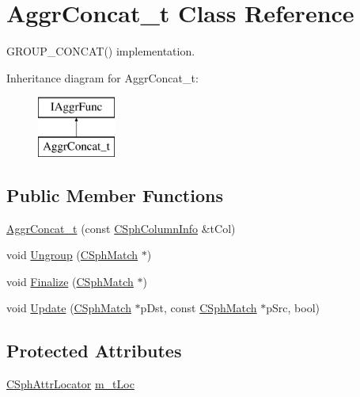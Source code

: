 \hypertarget{classAggrConcat__t}{\section{Aggr\-Concat\-\_\-t Class Reference}
\label{classAggrConcat__t}
}


G\-R\-O\-U\-P\-\_\-\-C\-O\-N\-C\-A\-T() implementation.  


Inheritance diagram for Aggr\-Concat\-\_\-t\-:\begin{figure}[H]
\begin{center}
\leavevmode
\includegraphics[height=2.000000cm]{classAggrConcat__t}
\end{center}
\end{figure}
\subsection*{Public Member Functions}
\begin{DoxyCompactItemize}
\item 
\hyperlink{classAggrConcat__t_ac91827989139b3f93aef23f0420badeb}{Aggr\-Concat\-\_\-t} (const \hyperlink{structCSphColumnInfo}{C\-Sph\-Column\-Info} \&t\-Col)
\item 
void \hyperlink{classAggrConcat__t_a9fb15e9e406a6f5d94ca1ffc67e3b3b1}{Ungroup} (\hyperlink{classCSphMatch}{C\-Sph\-Match} $\ast$)
\item 
void \hyperlink{classAggrConcat__t_a25e71aca38611f49455681057b94b482}{Finalize} (\hyperlink{classCSphMatch}{C\-Sph\-Match} $\ast$)
\item 
void \hyperlink{classAggrConcat__t_af5818c7bc563a9ba8a158b9abb9cdc19}{Update} (\hyperlink{classCSphMatch}{C\-Sph\-Match} $\ast$p\-Dst, const \hyperlink{classCSphMatch}{C\-Sph\-Match} $\ast$p\-Src, bool)
\end{DoxyCompactItemize}
\subsection*{Protected Attributes}
\begin{DoxyCompactItemize}
\item 
\hyperlink{structCSphAttrLocator}{C\-Sph\-Attr\-Locator} \hyperlink{classAggrConcat__t_ac233f8ca307bb5b97ade0dc6923fff67}{m\-\_\-t\-Loc}
\end{DoxyCompactItemize}


